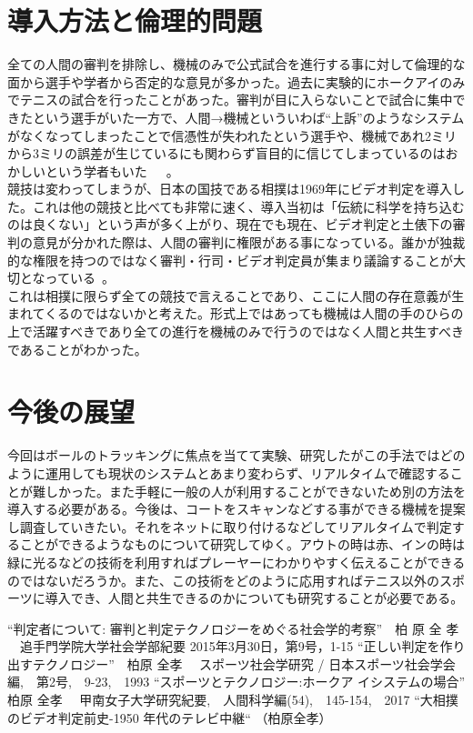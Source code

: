 \documentclass[a4j,10pt]{jsarticle}
\begin{document}
\section{導入方法と倫理的問題}

全ての人間の審判を排除し、機械のみで公式試合を進行する事に対して倫理的な面から選手や学者から否定的な意見が多かった。過去に実験的にホークアイのみでテニスの試合を行ったことがあった。審判が目に入らないことで試合に集中できたという選手がいた一方で、人間→機械といういわば“上訴”のようなシステムがなくなってしまったことで信憑性が失われたという選手や、機械であれ2ミリから3ミリの誤差が生じているにも関わらず盲目的に信じてしまっているのはおかしいという学者もいた~\cite{hantei}~\cite{teku}~\cite{sport}。
\\競技は変わってしまうが、日本の国技である相撲は1969年にビデオ判定を導入した。これは他の競技と比べても非常に速く、導入当初は「伝統に科学を持ち込むのは良くない」という声が多く上がり、現在でも現在、ビデオ判定と土俵下の審判の意見が分かれた際は、人間の審判に権限がある事になっている。誰かが独裁的な権限を持つのではなく審判・行司・ビデオ判定員が集まり議論することが大切となっている~\cite{sumou}。
\\これは相撲に限らず全ての競技で言えることであり、ここに人間の存在意義が生まれてくるのではないかと考えた。形式上ではあっても機械は人間の手のひらの上で活躍すべきであり全ての進行を機械のみで行うのではなく人間と共生すべきであることがわかった。


\section{今後の展望}
今回はボールのトラッキングに焦点を当てて実験、研究したがこの手法ではどのように運用しても現状のシステムとあまり変わらず、リアルタイムで確認することが難しかった。また手軽に一般の人が利用することができないため別の方法を導入する必要がある。今後は、コートをスキャンなどする事ができる機械を提案し調査していきたい。それをネットに取り付けるなどしてリアルタイムで判定することができるようなものについて研究してゆく。アウトの時は赤、インの時は緑に光るなどの技術を利用すればプレーヤーにわかりやすく伝えることができるのではないだろうか。また、この技術をどのように応用すればテニス以外のスポーツに導入でき、人間と共生できるのかについても研究することが必要である。



\begin{thebibliography}{99}
 “判定者について: 審判と判定テクノロジーをめぐる社会学的考察”　柏 原 全 孝 
　追手門学院大学社会学部紀要 2015年3月30日，第9号，1-15 
 “正しい判定を作り出すテクノロジー”　柏原 全孝 
　スポーツ社会学研究 / 日本スポーツ社会学会 編,　第2号,　9-23,　1993
“スポーツとテクノロジー:ホークア イシステムの場合”　柏原 全孝 
　甲南女子大学研究紀要,　人間科学編(54),　145-154,　2017 
“大相撲のビデオ判定前史-1950 年代のテレビ中継“ （柏原全孝）
\end{thebibliography}
\end{document}
